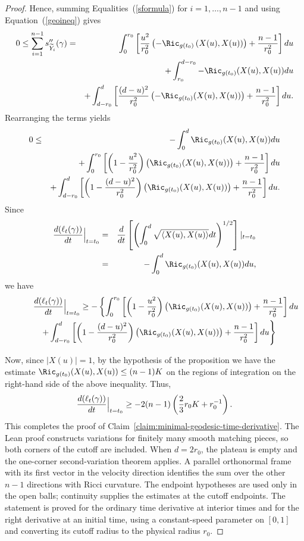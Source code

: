 \begin{proof}
Hence, summing Equalities~(\ref{sformula}) for $i=1,\ldots, n-1$ and
using Equation~(\ref{geoineq}) gives
\begin{eqnarray*}
0\le\sum_{i=1}^{n-1}s''_{\widetilde Y_i}(\gamma) & = &
\int_0^{r_0}\left[\frac{u^2}{r_0^2}\left(-\Ric_{g(t_0)}\left(X(u),X(u)\right)\right)
+\frac{n-1}{r_0^2}\right]du
\\
& & + \int_{r_0}^{d-r_0}-\Ric_{g(t_0)}(X(u),X(u))du
\\
 & & +\int_{d-r_0}^d\left[\frac{(d-u)^2}{r_0^2}
\left(-\Ric_{g(t_0)}(X(u),X(u))\right)+\frac{n-1}{r_0^2}\right]du.\end{eqnarray*}
Rearranging the terms yields
\begin{eqnarray*} 0 & \le & -\int_0^d \Ric_{g(t_0)}(X(u),X(u))du \\
& &+\int_0^{r_0}\left[\left(1-\frac{u^2}{r_0^2}\right)
\left(\Ric_{g(t_0)}(X(u),X(u))\right) +\frac{n-1}{r_0^2}\right]du\\
& & +\int_{d-r_0}^d
\left[\left(1-\frac{(d-u)^2}{r_0^2}\right)\left(\Ric_{g(t_0)}(X(u),X(u))\right)
+\frac{n-1}{r_0^2}\right]du.
\end{eqnarray*}
Since
\begin{eqnarray*}
\frac{d(\ell_t(\gamma))}{dt}\Bigl|_{t=t_0}\Bigr. & = &
\frac{d}{dt}\left[\left(\int_0^d\sqrt{\langle X(u),X(u)\rangle}dt\right)^{1/2}\right]|_{t=t_0} \\
& = & -\int_0^d \Ric_{g(t_0)}(X(u),X(u))du,
\end{eqnarray*}
we have
\begin{eqnarray*}
\lefteqn{\frac{d(\ell_t(\gamma))}{dt}\Bigl|_{t=t_0}\Bigr.\ge
-\left\{\int_0^{r_0}\left[\left(1-\frac{u^2}{r_0^2}\right)\left(\Ric_{g(t_0)}(X(u),X(u))\right)
+\frac{n-1}{r_0^2}\right]du\right.}
\\
& & \left. +\int_{d-r_0}^d
\left[\left(1-\frac{(d-u)^2}{r_0^2}\right)\left(\Ric_{g(t_0)}(X(u),X(u))\right)
+\frac{n-1}{r_0^2}\right]du\right\}
\end{eqnarray*}


Now, since $|X(u)|=1$, by the hypothesis of the proposition we have
the estimate $\Ric_{g(t_0)}(X(u),X(u))\le (n-1)K$ on the regions of
integration on the right-hand side of the above inequality. Thus,
\begin{eqnarray*}
\frac{d(\ell_t(\gamma))}{dt}\Bigl|_{t=t_0}\Bigr.\ge
-2(n-1)\left(\frac{2}{3}r_0K+r_0^{-1}\right).
\end{eqnarray*}
This completes the proof of Claim~\ref{claim:minimal-geodesic-time-derivative}.
The Lean proof constructs variations for finitely many smooth matching
pieces, so both corners of the cutoff are included. When $d=2r_0$,
the plateau is empty and the one-corner second-variation theorem applies.
A parallel orthonormal frame with its first vector in the velocity
direction identifies the sum over the other $n-1$ directions with Ricci
curvature. The endpoint hypotheses are used only in the open balls;
continuity supplies the estimates at the cutoff endpoints. The statement
is proved for the ordinary time derivative at interior times and for the
right derivative at an initial time, using a constant-speed parameter on
$[0,1]$ and converting its cutoff radius to the physical radius $r_0$.


\end{proof}
